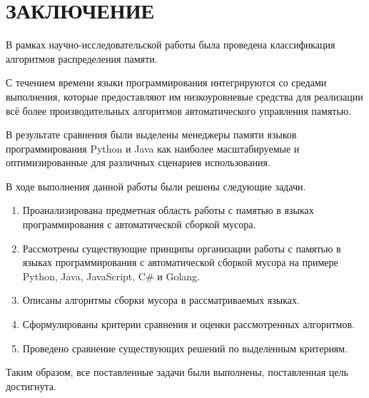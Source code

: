 \part*{ЗАКЛЮЧЕНИЕ}

В рамках научно-исследовательской работы была проведена классификация алгоритмов распределения памяти.

С течением времени языки программирования интегрируются со средами выполнения, которые предоставляют им низкоуровневые средства для реализации всё более производительных алгоритмов автоматического управления памятью.

В результате сравнения были выделены менеджеры памяти языков программирования Python и Java как наиболее масштабируемые и оптимизированные для различных сценариев использования.

В ходе выполнения данной работы были решены следующие задачи.

\begin{enumerate}[label*=\arabic*.]
	\item Проанализирована предметная область работы с памятью в языках программирования с автоматической сборкой мусора.
	\item Рассмотрены существующие принципы организации работы с памятью в языках программирования с автоматической сборкой мусора на примере Python, Java, JavaScript, C\# и Golang.
	\item Описаны алгоритмы сборки мусора в рассматриваемых языках.
	\item Сформулированы критерии сравнения и оценки рассмотренных алгоритмов.
	\item Проведено сравнение существующих решений по выделенным критериям. 
\end{enumerate}

Таким образом, все поставленные задачи были выполнены, поставленная цель достигнута.

